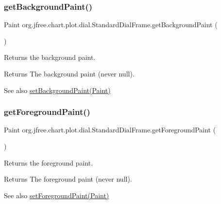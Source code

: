 \subsubsection{\texorpdfstring{get\+Background\+Paint()}{getBackgroundPaint()}}
{\footnotesize\ttfamily Paint org.\+jfree.\+chart.\+plot.\+dial.\+Standard\+Dial\+Frame.\+get\+Background\+Paint (\begin{DoxyParamCaption}{ }\end{DoxyParamCaption})}

Returns the background paint.

\begin{DoxyReturn}{Returns}
The background paint (never {\ttfamily null}).
\end{DoxyReturn}
\begin{DoxySeeAlso}{See also}
\mbox{\hyperlink{classorg_1_1jfree_1_1chart_1_1plot_1_1dial_1_1_standard_dial_frame_a3b3dce37f8a677dad3aa432c862a4c11}{set\+Background\+Paint(\+Paint)}} 
\end{DoxySeeAlso}
\mbox{\label{classorg_1_1jfree_1_1chart_1_1plot_1_1dial_1_1_standard_dial_frame_ac5647162c4aa638d569d1fb72337d354}} 
\subsubsection{\texorpdfstring{get\+Foreground\+Paint()}{getForegroundPaint()}}
{\footnotesize\ttfamily Paint org.\+jfree.\+chart.\+plot.\+dial.\+Standard\+Dial\+Frame.\+get\+Foreground\+Paint (\begin{DoxyParamCaption}{ }\end{DoxyParamCaption})}

Returns the foreground paint.

\begin{DoxyReturn}{Returns}
The foreground paint (never {\ttfamily null}).
\end{DoxyReturn}
\begin{DoxySeeAlso}{See also}
\mbox{\hyperlink{classorg_1_1jfree_1_1chart_1_1plot_1_1dial_1_1_standard_dial_frame_a5d1e2b7bc485b692abc4e28cd2d2ea5e}{set\+Foreground\+Paint(\+Paint)}} 
\end{DoxySeeAlso}
\mbox{\label{classorg_1_1jfree_1_1chart_1_1plot_1_1dial_1_1_standard_dial_frame_a639863a0f87163756360dc72f3faa719}} 

